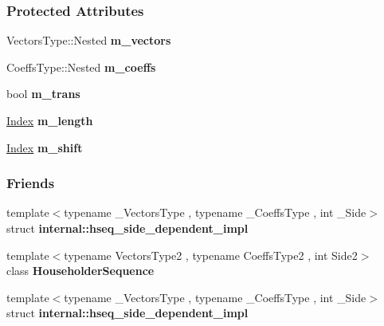 \subsubsection*{Protected Attributes}
\begin{DoxyCompactItemize}
\item 
\mbox{\label{group___householder___module_a84224ecbb213a3a89bb1e7146b35dcc4}} 
Vectors\+Type\+::\+Nested {\bfseries m\+\_\+vectors}
\item 
\mbox{\label{group___householder___module_a6768687f4d9fc45c1bb00035d3db0bca}} 
Coeffs\+Type\+::\+Nested {\bfseries m\+\_\+coeffs}
\item 
\mbox{\label{group___householder___module_a168eb7aef51e7fdcc1370ac3d614d53b}} 
bool {\bfseries m\+\_\+trans}
\item 
\mbox{\label{group___householder___module_a1395b340f17bc21b445b114acad519f8}} 
\hyperlink{group___core___module_a554f30542cc2316add4b1ea0a492ff02}{Index} {\bfseries m\+\_\+length}
\item 
\mbox{\label{group___householder___module_ac71c8da29363f79bb6ac246d46234363}} 
\hyperlink{group___core___module_a554f30542cc2316add4b1ea0a492ff02}{Index} {\bfseries m\+\_\+shift}
\end{DoxyCompactItemize}
\subsubsection*{Friends}
\begin{DoxyCompactItemize}
\item 
\mbox{\label{group___householder___module_ad2b8c53f81cf9ea056a2eec6ad36cb6b}} 
{\footnotesize template$<$typename \+\_\+\+Vectors\+Type , typename \+\_\+\+Coeffs\+Type , int \+\_\+\+Side$>$ }\\struct {\bfseries internal\+::hseq\+\_\+side\+\_\+dependent\+\_\+impl}
\item 
\mbox{\label{group___householder___module_a0391b4d06b329c6769a841677572ac6b}} 
{\footnotesize template$<$typename Vectors\+Type2 , typename Coeffs\+Type2 , int Side2$>$ }\\class {\bfseries Householder\+Sequence}
\item 
\mbox{\label{group___householder___module_af03a5e79c2305c3390a71cfbfd2232cf}} 
{\footnotesize template$<$typename \+\_\+\+Vectors\+Type , typename \+\_\+\+Coeffs\+Type , int \+\_\+\+Side$>$ }\\struct {\bfseries internal\+::hseq\+\_\+side\+\_\+dependent\+\_\+impl}
\end{DoxyCompactItemize}


